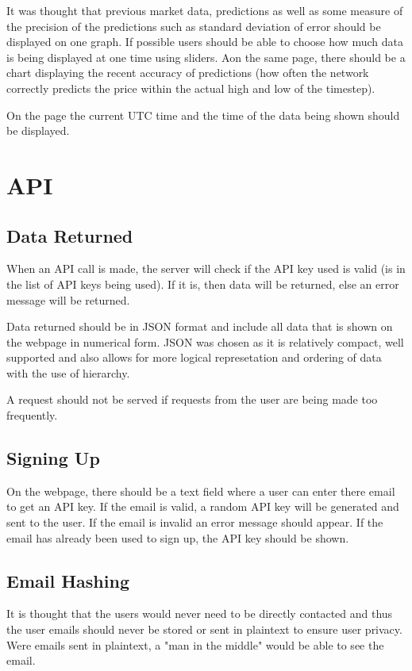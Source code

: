         It was thought that previous market data, predictions as well as some measure of the precision of the predictions such as standard deviation of error should be displayed on one graph. If possible users should be able to choose how much data is being displayed at one time using sliders. Aon the same page, there should be a chart displaying the recent accuracy of predictions (how often the network correctly predicts the price within the actual high and low of the timestep). 

        On the page the current UTC time and the time of the data being shown should be displayed.



    \section{API}
        
        \subsection{Data Returned}
        When an API call is made, the server will check if the API key used is valid (is in the list of API keys being used). If it is, then data will be returned, else an error message will be returned.

        Data returned should be in JSON format and include all data that is shown on the webpage in numerical form. JSON was chosen as it is relatively compact, well supported and also allows for more logical represetation and ordering of data with the use of hierarchy. 

        A request should not be served if requests from the user are being made too frequently.
    

        \subsection{Signing Up}
        On the webpage, there should be a text field where a user can enter there email to get an API key. If the email is valid, a random API key will be generated and sent to the user. If the email is invalid an error message should appear. If the email has already been used to sign up, the API key should be shown.

        \subsection{Email Hashing}
        It is thought that the users would never need to be directly contacted and thus the user emails should never be stored or sent in plaintext to ensure user privacy. Were emails sent in plaintext, a "man in the middle" would be able to see the email.

